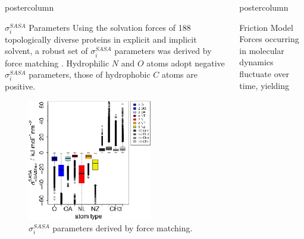 \documentclass{beamer}
\newcommand{\sig}{$\sigma_i^{SASA}$}
\newlength{\columnheight}
\begin{document}
\begin{frame}
\begin{columns}
\begin{column}{.45\textwidth}
\begin{beamercolorbox}[center]{postercolumn}
\begin{minipage}{.98\textwidth}
{\begin{myblock}{\sig{} Parameters}
Using the solvation forces of 188 topologically diverse proteins in explicit
and implicit solvent, a robust set of \sig{} parameters was derived by
force matching \cite{Fraternali:1996p939,Kleinjung_2012a}.
Hydrophilic $N$ and $O$ atoms adopt negative \sig{} parameters,
those of hydrophobic $C$ atoms are positive.
\vspace{2cm}
\begin{figure}
\begin{minipage}{1.0\textwidth}
	\centering\includegraphics[width=0.7\textwidth]{./sigma.all.atomtype.box.sided.eps}
	\caption{\sig{} parameters derived by force matching.}
\label{fig:projection}
\end{minipage}
\end{figure}
\end{myblock}\vfill
}\end{minipage}
\end{beamercolorbox}
\end{column}
\begin{column}{.45\textwidth}
\begin{beamercolorbox}[center]{postercolumn}
\begin{minipage}{.98\textwidth}  %
\parbox[t][\columnheight]{\textwidth}{ %
\begin{myblock}{Friction Model}
Forces occurring in molecular dynamics fluctuate over time, yielding

\end{myblock}}
\end{minipage}
\end{beamercolorbox}
\end{column}
\end{columns}
\end{frame}
\end{document}
